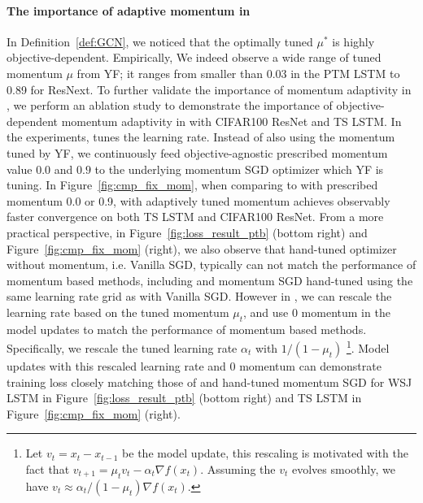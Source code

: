 \paragraph{The importance of adaptive momentum in \tuner}
In Definition~\ref{def:GCN}, we noticed that the optimally tuned $\mu^*$ is highly objective-dependent. Empirically, We indeed observe a wide range of tuned momentum $\mu$ from YF; it ranges from smaller than 0.03 in the PTM LSTM to 0.89 for ResNext. To further validate the importance of momentum adaptivity in \tuner, we perform an ablation study to demonstrate the importance of objective-dependent momentum adaptivity in \tuner with CIFAR100 ResNet and TS LSTM. In the experiments, \tuner tunes the learning rate. Instead of also using the momentum tuned by YF, we continuously feed objective-agnostic prescribed momentum value $0.0$ and $0.9$ to the underlying momentum SGD optimizer which YF is tuning. In Figure~\ref{fig:cmp_fix_mom}, when comparing to \tuner with prescribed momentum 0.0 or 0.9, \tuner with adaptively tuned momentum achieves observably faster convergence on both TS LSTM and CIFAR100 ResNet. From a more practical perspective, in Figure~\ref{fig:loss_result_ptb} (bottom right) and Figure~\ref{fig:cmp_fix_mom} (right), we also observe that hand-tuned optimizer without momentum, i.e. Vanilla SGD, typically can not match the performance of momentum based methods, including \tuner and momentum SGD hand-tuned using the same learning rate grid as with Vanilla SGD. However in \tuner, we can rescale the learning rate based on the \tuner tuned momentum $\mu_t$, and use 0 momentum in the model updates to match the performance of momentum based methods. Specifically, we rescale the \tuner tuned learning rate $\alpha_t$ with $1/(1 - \mu_t)$ \footnote{Let $v_t = x_t - x_{t - 1}$ be the model update, this rescaling is motivated with the fact that $v_{t+1} = \mu_t v_{t} - \alpha_t \nabla f(x_t)$. Assuming the $v_t$ evolves smoothly, we have $v_t \approx \alpha_t/(1-\mu_t) \nabla f(x_t)$.}. Model updates with this rescaled learning rate and 0 momentum can demonstrate training loss closely matching those of \tuner and hand-tuned momentum SGD for WSJ LSTM in Figure~\ref{fig:loss_result_ptb} (bottom right) and TS LSTM in Figure~\ref{fig:cmp_fix_mom} (right).



